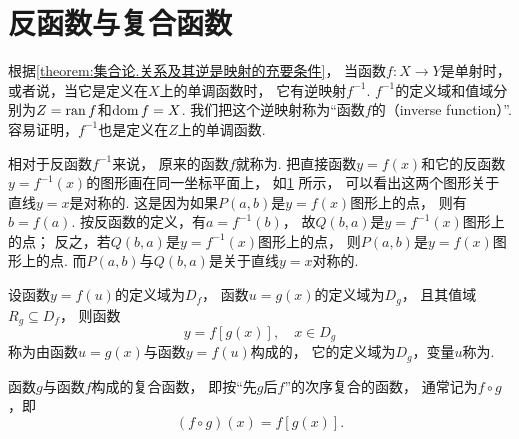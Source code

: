\section{反函数与复合函数}
根据\cref{theorem:集合论.关系及其逆是映射的充要条件}，
当函数\(f\colon X \to Y\)是单射时，
或者说，当它是定义在\(X\)上的单调函数时，
它有逆映射\(f^{-1}\).
\(f^{-1}\)的定义域和值域分别为\(Z=\operatorname{ran} f\)和\(\operatorname{dom} f=X\).
我们把这个逆映射称为“函数\(f\)的（inverse function）”.
容易证明，\(f^{-1}\)也是定义在\(Z\)上的单调函数.

相对于反函数\(f^{-1}\)来说，
原来的函数\(f\)就称为.
把直接函数\(y=f(x)\)和它的反函数\(y=f^{-1}(x)\)的图形画在同一坐标平面上，
如\cref{figure:函数.直接函数与反函数的图形的对称性} 所示，
可以看出这两个图形关于直线\(y=x\)是对称的.
这是因为如果\(P(a,b)\)是\(y=f(x)\)图形上的点，
则有\(b=f(a)\).
按反函数的定义，有\(a=f^{-1}(b)\)，
故\(Q(b,a)\)是\(y=f^{-1}(x)\)图形上的点；
反之，若\(Q(b,a)\)是\(y=f^{-1}(x)\)图形上的点，
则\(P(a,b)\)是\(y=f(x)\)图形上的点.
而\(P(a,b)\)与\(Q(b,a)\)是关于直线\(y=x\)对称的.

\begin{figure}[ht]
	\centering
	\caption{}\label{figure:函数.直接函数与反函数的图形的对称性}
\end{figure}

\begin{definition}
设函数\(y=f(u)\)的定义域为\(D_f\)，
函数\(u=g(x)\)的定义域为\(D_g\)，
且其值域\(R_g \subseteq D_f\)，
则函数\[
	y = f[g(x)],
	\quad x \in D_g
\]
称为由函数\(u=g(x)\)与函数\(y=f(u)\)构成的，
它的定义域为\(D_g\)，变量\(u\)称为.

函数\(g\)与函数\(f\)构成的复合函数，
即按“先\(g\)后\(f\)”的次序复合的函数，
通常记为\(f \circ g\)，即\[
	(f \circ g)(x) = f[g(x)].
\]
\end{definition}

